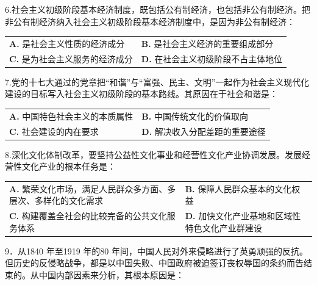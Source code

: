\documentclass[UTF8,11pt]{ctexart}
\begin{document}
6.社会主义初级阶段基本经济制度，既包括公有制经济，也包括非公有制经济。把非公有制经济纳入社会主义初级阶段基本经济制度中，是因为非公有制经济：


\begin{center}\begin{tabular}{>{\raggedright\arraybackslash}p{\dimexpr(\linewidth-4\tabcolsep)/2\relax}>{\raggedright\arraybackslash}p{\dimexpr(\linewidth-4\tabcolsep)/2\relax}}
\textbf{A.} 是社会主义性质的经济成分 & \textbf{B.} 是社会主义经济的重要组成部分\\[.35em]
\textbf{C.} 是为社会主义服务的经济成分 & \textbf{D.} 在社会主义初级阶段不占主体地位\\[.35em]\end{tabular}\end{center}

7.党的十七大通过的党章把“和谐”与“富强、民主、文明”一起作为社会主义现代化建设的目标写入社会主义初级阶段的基本路线。其原因在于社会和谐是：


\begin{center}\begin{tabular}{>{\raggedright\arraybackslash}p{\dimexpr(\linewidth-4\tabcolsep)/2\relax}>{\raggedright\arraybackslash}p{\dimexpr(\linewidth-4\tabcolsep)/2\relax}}
\textbf{A.} 中国特色社会主义的本质属性 & \textbf{B.} 中国传统文化的价值取向\\[.35em]
\textbf{C.} 社会建设的内在要求 & \textbf{D.} 解决收入分配差距的重要途径\\[.35em]\end{tabular}\end{center}

8.深化文化体制改革，要坚持公益性文化事业和经营性文化产业协调发展。发展经营性文化产业的根本任务是：


\begin{center}\begin{tabular}{>{\raggedright\arraybackslash}p{\dimexpr(\linewidth-4\tabcolsep)/2\relax}>{\raggedright\arraybackslash}p{\dimexpr(\linewidth-4\tabcolsep)/2\relax}}
\textbf{A.} 繁荣文化市场，满足人民群众多方面、多层次、多样化的文化需求 & \textbf{B.} 保障人民群众基本的文化权益\\[.35em]
\textbf{C.} 构建覆盖全社会的比较完备的公共文化服务体系 & \textbf{D.} 加快文化产业基地和区域性特色文化产业群建设\\[.35em]\end{tabular}\end{center}

9．从1840 年至1919 年的80 年间，中国人民对外来侵略进行了英勇顽强的反抗。但历史的反侵略战争，都是以中国失败、中国政府被迫签订丧权辱国的条约而告结束的。从中国内部因素来分析，其根本原因是：
\end{document}

